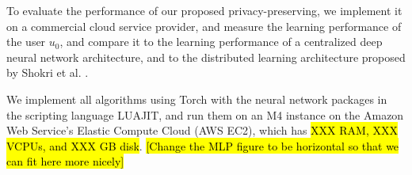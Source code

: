 \documentclass[conference]{IEEEtran}
\begin{document}
To evaluate the performance of our proposed privacy-preserving, we implement it on a commercial cloud service provider, and measure the
learning performance of the user $u_0$, and compare it to the learning performance of a centralized deep neural network
architecture, and to the distributed learning architecture proposed by Shokri et al. \cite{shokri2015privacy}. 

We implement all algorithms using Torch with the neural network packages in the scripting language LUAJIT, and run them on an M4
instance on the Amazon Web Service's Elastic Compute Cloud (AWS EC2), which has \hl{XXX RAM, XXX VCPUs, and XXX GB disk}.
\hl{[Change the MLP figure to be horizontal so that we can fit here more nicely]}
\end{document}
